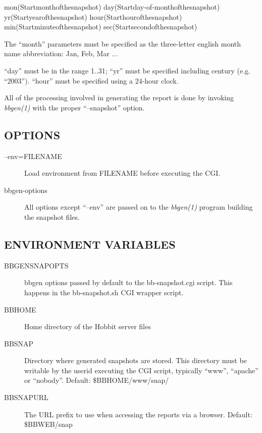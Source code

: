   
mon(Startmonthofthesnapshot)  
day(Startday-of-monthofthesnapshot)  
yr(Startyearofthesnapshot)  
hour(Starthourofthesnapshot)  
min(Startminuteofthesnapshot)  
sec(Startsecondofthesnapshot) 


  The ``month'' parameters must be specified as the three-letter
  english month name abbreviation: Jan, Feb, Mar ... 



  ``day'' must be in the range 1..31; ``yr'' must be specified
  including century (e.g. ``2003''). ``hour'' must be specified using
  a 24-hour clock. 



  All of the processing involved in generating the report is done by
  invoking \emph{bbgen(1)} with the proper ``--snapshot'' option. 


 
\subsection{OPTIONS}
\begin{description}
\item[--env=FILENAME] Load environment from FILENAME before executing the CGI. 

 

\item[bbgen-options] All options except ``--env'' are passed on to the \emph{bbgen(1)}
 program building the snapshot files. 

 


\end{description}


\subsection{ENVIRONMENT VARIABLES}
\begin{description}
\item[BBGENSNAPOPTS] bbgen options passed by default to the
  bb-snapshot.cgi script. This happens in the bb-snapshot.sh CGI
  wrapper script. 

\item[BBHOME] Home directory of the Hobbit server files 
\item[BBSNAP] Directory where generated snapshots are stored. This
  directory must be writable by the userid executing the CGI script,
  typically ``www'', ``apache'' or ``nobody''. Default:
  \$BBHOME/www/snap/ 

\item[BBSNAPURL] The URL prefix to use when accessing the reports via
  a browser. Default: \$BBWEB/snap 



\end{description}
